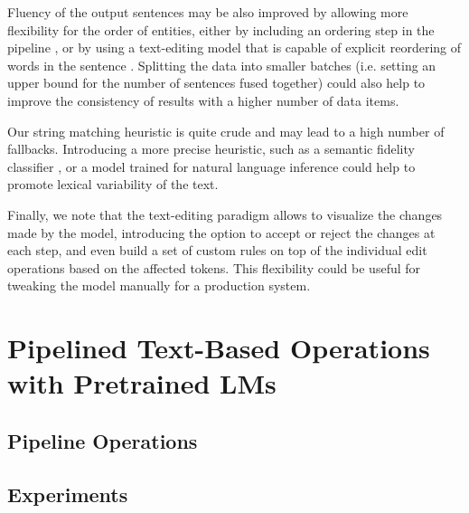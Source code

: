 Fluency of the output sentences may be also improved by allowing more flexibility for the order of entities, either by including an ordering step in the pipeline \citep{moryossef2019astep}, or by using a text-editing model that is capable of explicit reordering of words in the sentence \cite{mallinson2020felix}. Splitting the data into smaller batches (i.e. setting an upper bound for the number of sentences fused together) could also help to improve the consistency of results with a higher number of data items.

Our string matching heuristic is quite crude and may lead to a high number of fallbacks. Introducing a more precise heuristic, such as a semantic fidelity classifier \citep{harkous2020have}, or a model trained for natural language inference \citep{dusek2020nli} could help to promote lexical variability of the text.

Finally, we note that the text-editing paradigm allows to visualize the changes made by the model, introducing the option to accept or reject the changes at each step, and even build a set of custom rules on top of the individual edit operations based on the affected tokens. This flexibility could be useful for tweaking the model manually for a production system.






\section{Pipelined Text-Based Operations with Pretrained LMs}
\label{sec:pipeline}
\subsection{Pipeline Operations}
\label{sec:pipeline-ops}
\subsection{Experiments}
\label{sec:pipeline-exp}
